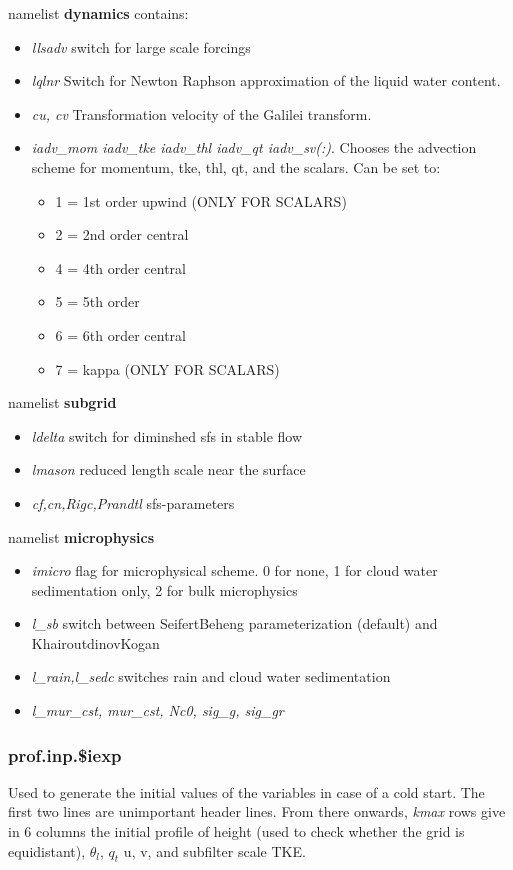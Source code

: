 \documentclass[a4paper,10pt]{article}
\begin{document}
namelist \textbf{dynamics} contains:
\begin{itemize}
 \item     \textit{llsadv} switch for large scale forcings
\item   \textit{lqlnr} Switch for Newton Raphson approximation of the liquid water content.
\item \textit{cu, cv}  Transformation velocity of the Galilei transform.
\item\textit{iadv\_mom  iadv\_tke  iadv\_thl  iadv\_qt  iadv\_sv(:)}. Chooses the advection scheme for momentum, tke, thl, qt, and the scalars. Can be set to:
\begin{itemize}
 \item 1 = 1st order upwind (ONLY FOR SCALARS)
 \item 2 = 2nd order central
 \item 4 = 4th order central
 \item 5 = 5th order
 \item 6 = 6th order central
 \item 7 = kappa (ONLY FOR SCALARS)
\end{itemize}
\end{itemize}
namelist \textbf{subgrid}
\begin{itemize}
 \item \textit{ldelta} switch for diminshed sfs in stable flow
\item \textit{lmason} reduced length scale near the surface
\item \textit{cf,cn,Rigc,Prandtl} sfs-parameters
\end{itemize}
namelist \textbf{microphysics}
\begin{itemize}
 \item \textit{imicro} flag for microphysical scheme. 0 for none, 1 for cloud water sedimentation only, 2 for bulk microphysics
\item \textit{l\_sb} switch between SeifertBeheng parameterization (default) and KhairoutdinovKogan
\item \textit{l\_rain,l\_sedc} switches rain and cloud water sedimentation
\item \textit{l\_mur\_cst, mur\_cst, Nc0, sig\_g, sig\_gr}
\end{itemize}

\subsubsection*{prof.inp.\$iexp}
Used to generate the initial values of the variables in case of a cold start. The first two lines are unimportant header lines. From there onwards, \textit{kmax} rows give in 6 columns the initial profile of height (used to check whether the grid is equidistant), $\theta_l$, $q_t$ u, v, and subfilter scale TKE.
\end{document}
